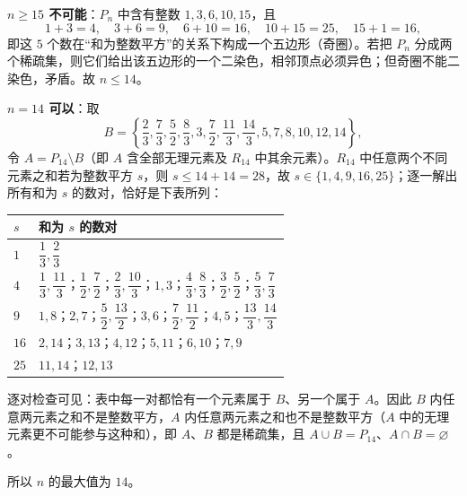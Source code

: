 \begin{answer}
\textbf{$n\geqslant15$ 不可能}：$P_n$ 中含有整数 $1,3,6,10,15$，且
\nopagebreak[4]
\[1+3=4,\quad 3+6=9,\quad 6+10=16,\quad 10+15=25,\quad 15+1=16,\]
即这 $5$ 个数在“和为整数平方”的关系下构成一个五边形（奇圈）。若把 $P_n$ 分成两个稀疏集，则它们给出该五边形的一个二染色，相邻顶点必须异色；但奇圈不能二染色，矛盾。故 $n\leqslant14$。

\textbf{$n=14$ 可以}：取
\nopagebreak[4]
\[B=\left\{\frac23,\frac73,\frac52,\frac83,3,\frac72,\frac{11}3,\frac{14}3,5,7,8,10,12,14\right\},\]
令 $A=P_{14}\setminus B$（即 $A$ 含全部无理元素及 $R_{14}$ 中其余元素）。$R_{14}$ 中任意两个不同元素之和若为整数平方 $s$，则 $s\leqslant14+14=28$，故 $s\in\{1,4,9,16,25\}$；逐一解出所有和为 $s$ 的数对，恰好是下表所列：

\begin{center}
\begin{tabular}{ll}
\toprule
$s$ & 和为 $s$ 的数对 \\
\midrule
$1$ & $\dfrac13,\dfrac23$ \\
$4$ & $\dfrac13,\dfrac{11}3$；$\dfrac12,\dfrac72$；$\dfrac23,\dfrac{10}3$；$1,3$；$\dfrac43,\dfrac83$；$\dfrac32,\dfrac52$；$\dfrac53,\dfrac73$ \\
$9$ & $1,8$；$2,7$；$\dfrac52,\dfrac{13}2$；$3,6$；$\dfrac72,\dfrac{11}2$；$4,5$；$\dfrac{13}3,\dfrac{14}3$ \\
$16$ & $2,14$；$3,13$；$4,12$；$5,11$；$6,10$；$7,9$ \\
$25$ & $11,14$；$12,13$ \\
\bottomrule
\end{tabular}
\end{center}

逐对检查可见：表中每一对都恰有一个元素属于 $B$、另一个属于 $A$。因此 $B$ 内任意两元素之和不是整数平方，$A$ 内任意两元素之和也不是整数平方（$A$ 中的无理元素更不可能参与这种和），即 $A$、$B$ 都是稀疏集，且 $A\cup B=P_{14}$、$A\cap B=\varnothing$。

所以 $n$ 的最大值为 $14$。



\end{answer}